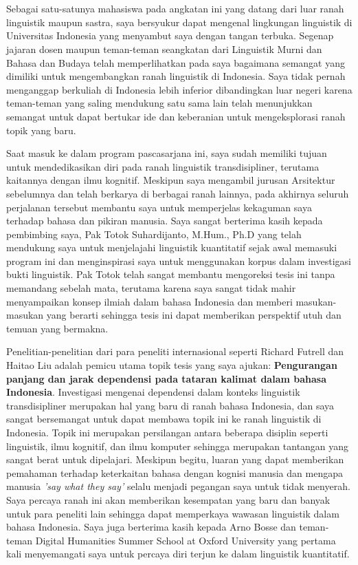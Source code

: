 \chapter*{\kataPengantar}

Sebagai satu-satunya mahasiswa pada angkatan ini yang datang dari luar ranah linguistik maupun sastra, saya bersyukur dapat mengenal lingkungan linguistik di Universitas Indonesia yang menyambut saya dengan tangan terbuka. Segenap jajaran dosen maupun teman-teman seangkatan dari Linguistik Murni dan Bahasa dan Budaya telah memperlihatkan pada saya bagaimana semangat yang dimiliki untuk mengembangkan ranah linguistik di Indonesia. Saya tidak pernah menganggap berkuliah di Indonesia lebih inferior dibandingkan luar negeri karena teman-teman yang saling mendukung satu sama lain telah menunjukkan semangat untuk dapat bertukar ide dan keberanian untuk mengeksplorasi ranah topik yang baru.

Saat masuk ke dalam program pascasarjana ini, saya sudah memiliki tujuan untuk mendedikasikan diri pada ranah linguistik transdisipliner, terutama kaitannya dengan ilmu kognitif. Meskipun saya mengambil jurusan Arsitektur sebelumnya dan telah berkarya di berbagai ranah lainnya, pada akhirnya seluruh perjalanan tersebut membantu saya untuk memperjelas kekaguman saya terhadap bahasa dan pikiran manusia. Saya sangat berterima kasih kepada pembimbing saya, Pak Totok Suhardijanto, M.Hum., Ph.D yang telah mendukung saya untuk menjelajahi linguistik kuantitatif sejak awal memasuki program ini dan menginspirasi saya untuk menggunakan korpus dalam investigasi bukti linguistik. Pak Totok telah sangat membantu mengoreksi tesis ini tanpa memandang sebelah mata, terutama karena saya sangat tidak mahir menyampaikan konsep ilmiah dalam bahasa Indonesia dan memberi masukan-masukan yang berarti sehingga tesis ini dapat memberikan perspektif utuh dan temuan yang bermakna. 

Penelitian-penelitian dari para peneliti internasional seperti Richard Futrell dan Haitao Liu adalah pemicu utama topik tesis yang saya ajukan: \textbf{Pengurangan panjang dan jarak dependensi pada tataran kalimat dalam bahasa Indonesia}. Investigasi mengenai dependensi dalam konteks linguistik transdisipliner merupakan hal yang baru di ranah bahasa Indonesia, dan saya sangat bersemangat untuk dapat membawa topik ini ke ranah linguistik di Indonesia. Topik ini merupakan persilangan antara beberapa disiplin seperti linguistik, ilmu kognitif, dan ilmu komputer sehingga merupakan tantangan yang sangat berat untuk dipelajari. Meskipun begitu, luaran yang dapat memberikan pemahaman terhadap keterkaitan bahasa dengan kognisi manusia dan mengapa manusia \textit{'say what they say'} selalu menjadi pegangan saya untuk tidak menyerah. Saya percaya ranah ini akan memberikan kesempatan yang baru dan banyak untuk para peneliti lain sehingga dapat memperkaya wawasan linguistik dalam bahasa Indonesia. Saya juga berterima kasih kepada Arno Bosse dan teman-teman Digital Humanities Summer School at Oxford University yang pertama kali menyemangati saya untuk percaya diri terjun ke dalam linguistik kuantitatif. 


